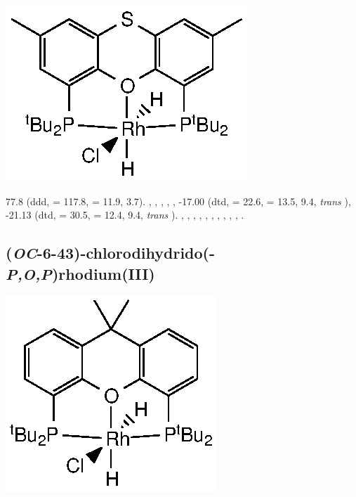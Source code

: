 \begin{structure}[h]
\begin{center}
\includegraphics{../Structures/StBuRhClH2.eps}
\end{center}
\end{structure}

77.8 (ddd, \JRhP{} = 117.8, \JPH{} = 11.9, 3.7).
,
,
,
,
,
-17.00 (dtd, \JRhH{} = 22.6, \JPH{} = 13.5, \JHH{} 9.4,  \emph{trans} ),
-21.13 (dtd, \JRhH{} = 30.5, \JPH{} = 12.4, \JHH{} 9.4,  \emph{trans} ).
,
,
,
,
,
,
,
,
,
,
.



\subsection*{(\emph{OC}-6-43)-chlorodihydrido(\tBuxantphosk-\emph{P,O,P})rhodium(III)}

\begin{structure}[h]
\begin{center}
\includegraphics{../Structures/CtBuRhClH2.eps}
\end{center}
\end{structure}

